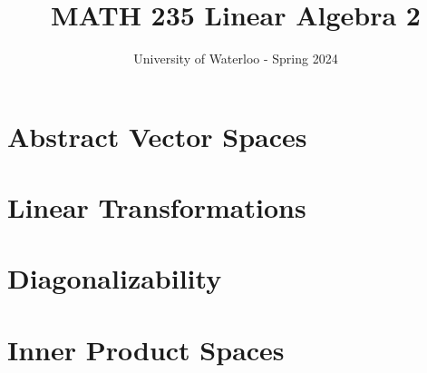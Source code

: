 \documentclass{article}
\title{MATH 235 Linear Algebra 2}
\author{University of Waterloo - Spring 2024}
\begin{document}
\maketitle

\tableofcontentsnewpage{}

\section{Abstract Vector Spaces}



\section{Linear Transformations}



\section{Diagonalizability}


\section{Inner Product Spaces}

\end{document}
